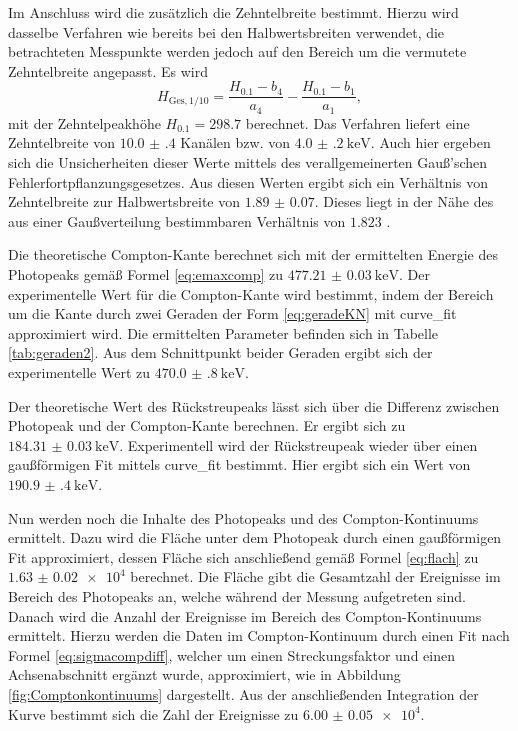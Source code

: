 Im Anschluss wird die zusätzlich die Zehntelbreite bestimmt. Hierzu wird dasselbe Verfahren wie bereits bei den Halbwertsbreiten verwendet, die betrachteten Messpunkte werden jedoch auf den Bereich um die vermutete Zehntelbreite angepasst. Es wird
\begin{equation}
    H_{\text{Ges},1/10} = \frac{H_{0.1}-b_4}{a_4} - \frac{H_{0.1}-b_1}{a_1}, \label{eq:Z2}
\end{equation}
mit der Zehntelpeakhöhe $H_{0.1}=\num{298.7}$ berechnet.
Das Verfahren liefert eine Zehntelbreite von $\num{10.0(4)}$ Kanälen bzw. von $\SI{4.0(2)}{\kilo\electronvolt}$. Auch hier ergeben sich die Unsicherheiten dieser Werte mittels des verallgemeinerten Gauß’schen Fehlerfortpflanzungsgesetzes. Aus diesen Werten ergibt sich ein Verhältnis von Zehntelbreite zur Halbwertsbreite von $\num{1.89(7)}$. Dieses liegt in der Nähe des aus einer Gaußverteilung bestimmbaren Verhältnis von $\num{1.823}$  \cite{V18}. 

Die theoretische Compton-Kante berechnet sich mit der ermittelten Energie des Photopeaks gemäß Formel \eqref{eq:emaxcomp} zu $\SI{477.21(3)}{\kilo\electronvolt}$. Der experimentelle Wert für die Compton-Kante wird bestimmt, indem der Bereich um die Kante durch zwei Geraden der Form \eqref{eq:geradeKN} mit curve\_fit \cite{scipy} approximiert wird. Die ermittelten Parameter befinden sich in Tabelle \ref{tab:geraden2}. Aus dem Schnittpunkt beider Geraden ergibt sich der experimentelle Wert zu $\SI{470.0(8)}{\kilo\electronvolt}$.

Der theoretische Wert des Rückstreupeaks lässt sich über die Differenz zwischen Photopeak und der Compton-Kante berechnen. Er ergibt sich zu $\SI{184.31(3)}{\kilo\electronvolt}$. Experimentell wird der Rückstreupeak wieder über einen gaußförmigen Fit mittels curve\_fit \cite{scipy} bestimmt. Hier ergibt sich ein Wert von $\SI{190.9(4)}{\kilo\electronvolt}$. 

Nun werden noch die Inhalte des Photopeaks und des Compton-Kontinuums ermittelt. Dazu wird die Fläche unter dem Photopeak durch einen gaußförmigen Fit approximiert, dessen Fläche sich anschließend gemäß Formel \eqref{eq:flach} zu $\num{1.63(2)e4}$ berechnet. Die Fläche gibt die Gesamtzahl der Ereignisse im Bereich des Photopeaks an, welche während der Messung aufgetreten sind. Danach wird die Anzahl der Ereignisse im Bereich des Compton-Kontinuums ermittelt. Hierzu werden die Daten im Compton-Kontinuum durch einen Fit nach Formel \eqref{eq:sigmacompdiff}, welcher um einen Streckungsfaktor und einen Achsenabschnitt ergänzt wurde, approximiert, wie in Abbildung \ref{fig:Comptonkontinuums} dargestellt. Aus der anschließenden Integration der Kurve bestimmt sich die Zahl der Ereignisse zu $\num{6.00(5)e4}$. 

